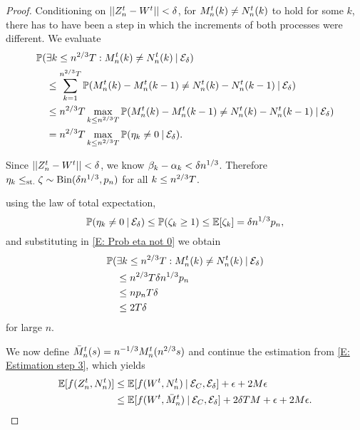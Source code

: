 \begin{proof}
Conditioning on $||Z_n^t - W^t|| < \delta$, for $M_n^t(k) \neq N_n^t(k)$ to hold for some $k$,
there has to have been a step in which the increments of both processes were different.
We evaluate
\begin{equation} \label{E: Prob eta not 0}
\begin{aligned}
&\mathbb{P}(\exists k\leq n^{2 / 3}T: M_n^t(k) \neq N_n^t(k) \: | \: \mathcal{E}_{\delta}) \\
&\quad \leq \sum_{k=1}^{n^{2 / 3}T} \mathbb{P}( M_n^t(k) - M_n^t(k-1) \neq N_n^t(k) - N_n^t(k-1) \: | \: \mathcal{E}_{\delta}) \\
&\quad \leq n^{2 / 3}T \max_{k \leq n^{2 / 3}T} \mathbb{P}(M_n^t(k) - M_n^t(k-1) \neq N_n^t(k) - N_n^t(k-1) \: | \: \mathcal{E}_{\delta}) \\
&\quad = n^{2 / 3}T \max_{k \leq n^{2 / 3}T} \mathbb{P}( \eta_k \neq 0 \: | \: \mathcal{E}_{\delta} ).
\end{aligned}
\end{equation}

Since $||Z_n^t - W^t|| < \delta$, we know $\beta_k - \alpha_k < \delta n^{1 / 3}$. Therefore
$\eta_k \leq_{\text{st.}} \zeta \sim \operatorname*{Bin}(\delta n^{1 / 3}, p_n)$ for all $k \leq n^{2 / 3}T$.

using the law of total expectation,
\begin{equation}
\mathbb{P}( \eta_k \neq 0 \: | \: \mathcal{E}_{\delta} ) \leq \mathbb{P}( \zeta_k \geq 1 ) \leq \mathbb{E}[\zeta_k] = \delta n^{1 / 3}p_n,
\end{equation}
and substituting in \eqref{E: Prob eta not 0} we obtain
\begin{equation}
\begin{aligned}
&\mathbb{P}(\exists k\leq n^{2 / 3}T: M_n^t(k) \neq N_n^t(k) \: | \: \mathcal{E}_{\delta}) \\
&\quad \leq n^{2 / 3}T\delta n^{1 / 3}p_n \\
&\quad \leq n p_n T \delta \\
&\quad \leq 2T\delta 
\end{aligned}
\end{equation}
for large $n$.

We now define $\bar{M}_n^t(s) = n^{-1 / 3} M_n^t(n^{2 / 3}s)$ and continue the estimation from \eqref{E: Estimation step 3},
which yields
\begin{equation} \label{E: Estimation step 4}
\begin{aligned}
\mathbb{E}[f(Z_n^t, N_n^t)] 
&\leq \mathbb{E}[f(W^t, N_n^t) \: | \: \mathcal{E}_{C}, \mathcal{E}_{\delta}] + \epsilon + 2M\epsilon   \\
&\leq \mathbb{E}[f(W^t, \bar{M}_n^t) \: | \: \mathcal{E}_{C}, \mathcal{E}_{\delta}] + 2\delta T M + \epsilon  + 2M\epsilon  .
\end{aligned}
\end{equation}


\end{proof}
